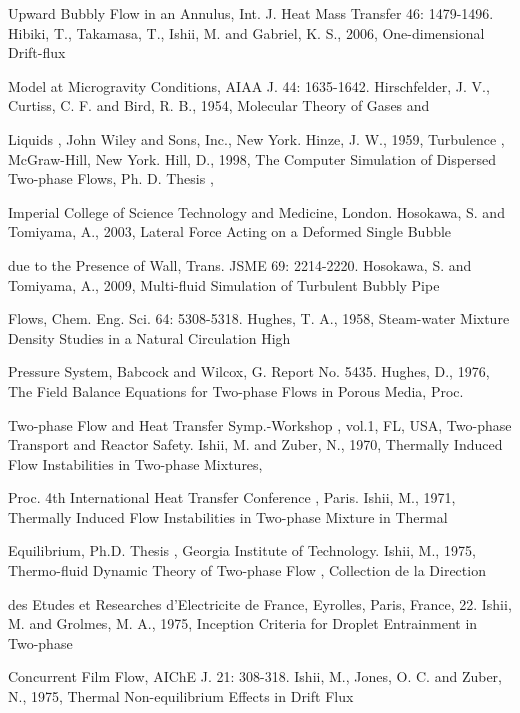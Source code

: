 \documentclass[11pt,a4paper,openany,fontset=none]{ctexbook}
\begin{document}
{\small\raggedright\noindent Upward Bubbly Flow in an Annulus, Int. J. Heat Mass Transfer 46: 1479-1496. Hibiki, T., Takamasa, T., Ishii, M. and Gabriel, K. S., 2006, One-dimensional Drift-flux\par}
{\small\raggedright\noindent Model at Microgravity Conditions, AIAA J. 44: 1635-1642. Hirschfelder, J. V., Curtiss, C. F. and Bird, R. B., 1954, Molecular Theory of Gases and\par}
{\small\raggedright\noindent Liquids , John Wiley and Sons, Inc., New York. Hinze, J. W., 1959, Turbulence , McGraw-Hill, New York. Hill, D., 1998, The Computer Simulation of Dispersed Two-phase Flows, Ph. D. Thesis ,\par}
{\small\raggedright\noindent Imperial College of Science Technology and Medicine, London. Hosokawa, S. and Tomiyama, A., 2003, Lateral Force Acting on a Deformed Single Bubble\par}
{\small\raggedright\noindent due to the Presence of Wall, Trans. JSME 69: 2214-2220. Hosokawa, S. and Tomiyama, A., 2009, Multi-fluid Simulation of Turbulent Bubbly Pipe\par}
{\small\raggedright\noindent Flows, Chem. Eng. Sci. 64: 5308-5318. Hughes, T. A., 1958, Steam-water Mixture Density Studies in a Natural Circulation High\par}
{\small\raggedright\noindent Pressure System, Babcock and Wilcox, G. Report No. 5435. Hughes, D., 1976, The Field Balance Equations for Two-phase Flows in Porous Media, Proc.\par}
{\small\raggedright\noindent Two-phase Flow and Heat Transfer Symp.-Workshop , vol.1, FL, USA, Two-phase Transport and Reactor Safety. Ishii, M. and Zuber, N., 1970, Thermally Induced Flow Instabilities in Two-phase Mixtures,\par}
{\small\raggedright\noindent Proc. 4th International Heat Transfer Conference , Paris. Ishii, M., 1971, Thermally Induced Flow Instabilities in Two-phase Mixture in Thermal\par}
{\small\raggedright\noindent Equilibrium, Ph.D. Thesis , Georgia Institute of Technology. Ishii, M., 1975, Thermo-fluid Dynamic Theory of Two-phase Flow , Collection de la Direction\par}
{\small\raggedright\noindent des Etudes et Researches d’Electricite de France, Eyrolles, Paris, France, 22. Ishii, M. and Grolmes, M. A., 1975, Inception Criteria for Droplet Entrainment in Two-phase\par}
{\small\raggedright\noindent Concurrent Film Flow, AIChE J. 21: 308-318. Ishii, M., Jones, O. C. and Zuber, N., 1975, Thermal Non-equilibrium Effects in Drift Flux\par}
\end{document}
